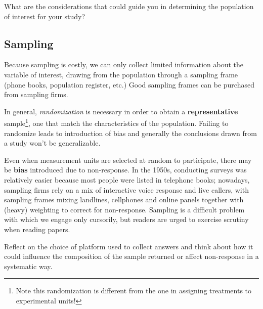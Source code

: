 \documentclass[
  11pt,
  letterpaper,
]{scrbook}
\theoremstyle{definition}
\theoremstyle{definition}
\theoremstyle{remark}
\begin{document}
\begin{tcolorbox}[enhanced jigsaw, left=2mm, leftrule=.75mm, coltitle=black, breakable, bottomrule=.15mm, colframe=quarto-callout-note-color-frame, titlerule=0mm, colbacktitle=quarto-callout-note-color!10!white, rightrule=.15mm, toprule=.15mm, title=\textcolor{quarto-callout-note-color}{\faInfo}\hspace{0.5em}{Thinking outside the box}, opacityback=0, toptitle=1mm, bottomtitle=1mm, arc=.35mm, opacitybacktitle=0.6, colback=white]

What are the considerations that could guide you in determining the
population of interest for your study?

\end{tcolorbox}

\subsection{Sampling}\label{sampling}

Because sampling is costly, we can only collect limited information
about the variable of interest, drawing from the population through a
sampling frame (phone books, population register, etc.) Good sampling
frames can be purchased from sampling firms.

In general, \emph{randomization} is necessary in order to obtain a
\textbf{representative} sample\footnote{Note this randomization is
  different from the one in assigning treatments to experimental units!},
one that match the characteristics of the population. Failing to
randomize leads to introduction of bias and generally the conclusions
drawn from a study won't be generalizable.

Even when measurement units are selected at random to participate, there
may be \textbf{bias} introduced due to non-response. In the 1950s,
conducting surveys was relatively easier because most people were listed
in telephone books; nowadays, sampling firms rely on a mix of
interactive voice response and live callers, with sampling frames mixing
landlines, cellphones and online panels together with (heavy) weighting
to correct for non-response. Sampling is a difficult problem with which
we engage only cursorily, but readers are urged to exercise scrutiny
when reading papers.

\begin{tcolorbox}[enhanced jigsaw, left=2mm, leftrule=.75mm, coltitle=black, breakable, bottomrule=.15mm, colframe=quarto-callout-note-color-frame, titlerule=0mm, colbacktitle=quarto-callout-note-color!10!white, rightrule=.15mm, toprule=.15mm, title=\textcolor{quarto-callout-note-color}{\faInfo}\hspace{0.5em}{Thinking outside the box}, opacityback=0, toptitle=1mm, bottomtitle=1mm, arc=.35mm, opacitybacktitle=0.6, colback=white]

Reflect on the choice of platform used to collect answers and think
about how it could influence the composition of the sample returned or
affect non-response in a systematic way.

\end{tcolorbox}
\end{document}
